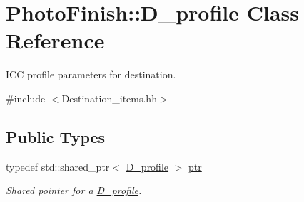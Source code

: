 \hypertarget{class_photo_finish_1_1_d__profile}{}\section{Photo\+Finish\+:\+:D\+\_\+profile Class Reference}
\label{class_photo_finish_1_1_d__profile}


I\+CC profile parameters for destination.  




{\ttfamily \#include $<$Destination\+\_\+items.\+hh$>$}

\subsection*{Public Types}
\begin{DoxyCompactItemize}
\item 
typedef std\+::shared\+\_\+ptr$<$ \hyperlink{class_photo_finish_1_1_d__profile}{D\+\_\+profile} $>$ \hyperlink{class_photo_finish_1_1_d__profile_a9711c3571babd1b40709747a63866b38}{ptr}
\begin{DoxyCompactList}\small\item\em Shared pointer for a \hyperlink{class_photo_finish_1_1_d__profile}{D\+\_\+profile}. \end{DoxyCompactList}\end{DoxyCompactItemize}
